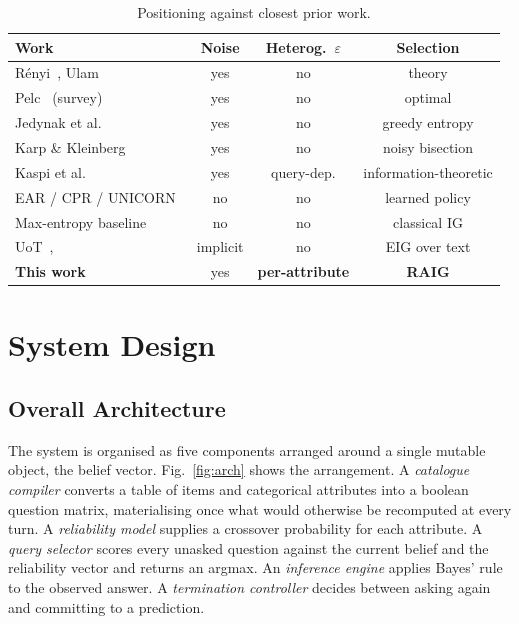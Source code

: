 \documentclass[conference]{IEEEtran}
\begin{document}
\begin{table}[t]
\caption{Positioning against closest prior work.}
\label{tab:related}
\centering
\footnotesize
\begin{tabular}{@{}lccc@{}}
\toprule
\textbf{Work} & \textbf{Noise} & \textbf{Heterog.\ $\varepsilon$} & \textbf{Selection} \\
\midrule
R\'enyi~\cite{renyi1961}, Ulam~\cite{ulam1976} & yes & no & theory \\
Pelc~\cite{pelc2002} (survey) & yes & no & optimal \\
Jedynak et al.~\cite{jedynak2012} & yes & no & greedy entropy \\
Karp \& Kleinberg~\cite{karp2007} & yes & no & noisy bisection \\
Kaspi et al.~\cite{kaspi2018} & yes & query-dep. & information-theoretic \\
EAR / CPR / UNICORN~\cite{lei2020ear,lei2020cpr,deng2021unicorn} & no & no & learned policy \\
Max-entropy baseline & no & no & classical IG \\
UoT~\cite{hu2024uot}, \cite{mazzaccara2024} & implicit & no & EIG over text \\
\midrule
\textbf{This work} & yes & \textbf{per-attribute} & \textbf{RAIG} \\
\bottomrule
\end{tabular}
\end{table}

\section{System Design}

\subsection{Overall Architecture}

The system is organised as five components arranged around a single mutable
object, the belief vector. Fig.~\ref{fig:arch} shows the arrangement. A
\emph{catalogue compiler} converts a table of items and categorical attributes
into a boolean question matrix, materialising once what would otherwise be
recomputed at every turn. A \emph{reliability model} supplies a crossover
probability for each attribute. A \emph{query selector} scores every unasked
question against the current belief and the reliability vector and returns an
argmax. An \emph{inference engine} applies Bayes' rule to the observed answer.
A \emph{termination controller} decides between asking again and committing to
a prediction.
\end{document}
